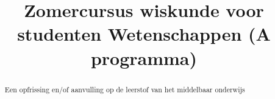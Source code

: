 \documentclass[handout,numbers,noauthor,nooutcomes,wordchoicegiven]{xourse}
\title{Zomercursus wiskunde voor studenten Wetenschappen (A programma)}
\begin{document}
\begin{abstract}
	Een opfrissing en/of aanvulling op de leerstof van het middelbaar onderwijs
\end{abstract}

\setcounter{tocdepth}{2}

\maketitle

\tableofcontents\clearpage 

\sectionstyle
{}
\begin{onlineOnly}
\end{onlineOnly}

\newpage
\chapterstyle
{}
\end{document}
